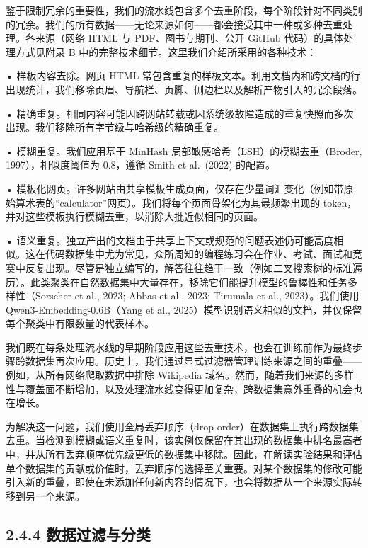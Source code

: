 鉴于限制冗余的重要性，我们的流水线包含多个去重阶段，每个阶段针对不同类别的冗余。我们的所有数据——无论来源如何——都会接受其中一种或多种去重处理。各来源（网络 HTML 与 PDF、图书与期刊、公开 GitHub 代码）的具体处理方式见附录 B 中的完整技术细节。这里我们介绍所采用的各种技术：

• 样板内容去除。网页 HTML 常包含重复的样板文本。利用文档内和跨文档的行出现统计，我们移除页眉、导航栏、页脚、侧边栏以及解析产物引入的冗余段落。

• 精确重复。相同内容可能因跨网站转载或因系统级故障造成的重复快照而多次出现。我们移除所有字节级与哈希级的精确重复。

• 模糊重复。我们应用基于 MinHash 局部敏感哈希（LSH）的模糊去重（Broder, 1997），相似度阈值为 0.8，遵循 Smith et al.~(2022) 的配置。

• 模板化网页。许多网站由共享模板生成页面，仅存在少量词汇变化（例如带原始算术表的“calculator”网页）。我们将每个页面骨架化为其最频繁出现的 token，并对这些模板执行模糊去重，以消除大批近似相同的页面。

• 语义重复。独立产出的文档由于共享上下文或规范的问题表述仍可能高度相似。这在代码数据集中尤为常见，众所周知的编程练习会在作业、考试、面试和竞赛中反复出现。尽管是独立编写的，解答往往趋于一致（例如二叉搜索树的标准遍历）。此类聚类在自然数据集中大量存在，移除它们能提升模型的鲁棒性和任务多样性（Sorscher et al., 2023; Abbas et al., 2023; Tirumala et al., 2023）。我们使用 Qwen3-Embedding-0.6B（Yang et al., 2025）模型识别语义相似的文档，并仅保留每个聚类中有限数量的代表样本。



我们既在每条处理流水线的早期阶段应用这些去重技术，也会在训练前作为最终步骤跨数据集再次应用。历史上，我们通过显式过滤器管理训练来源之间的重叠——例如，从所有网络爬取数据中排除 Wikipedia 域名。然而，随着我们来源的多样性与覆盖面不断增加，以及处理流水线变得更加复杂，跨数据集意外重叠的机会也在增长。

为解决这一问题，我们使用全局丢弃顺序（drop-order）在数据集上执行跨数据集去重。当检测到模糊或语义重复时，该实例仅保留在其出现的数据集中排名最高者中，并从所有丢弃顺序优先级更低的数据集中移除。因此，在解读实验结果和评估单个数据集的贡献或价值时，丢弃顺序的选择至关重要。对某个数据集的修改可能引入新的重叠，即使在未添加任何新内容的情况下，也会将数据从一个来源实际转移到另一个来源。

\subsection{2.4.4 数据过滤与分类}\label{filtering-and-categorization-of-data}

